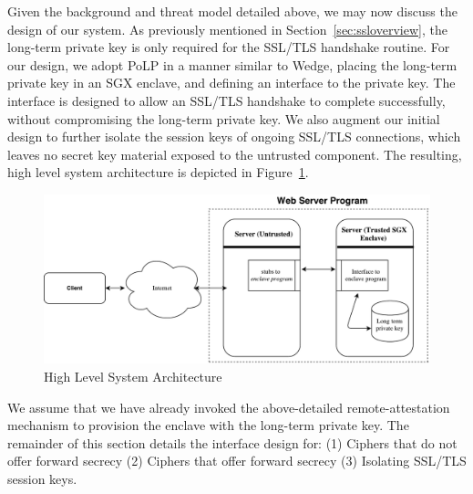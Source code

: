 \documentclass[../../main.tex]{subfiles}
\begin{document}
Given the background and threat model detailed above, we may now
discuss the design of our system. As previously mentioned in
Section~\ref{sec:ssloverview}, the long-term private key is only
required for the SSL/TLS handshake routine. For our design, we adopt
PoLP in a manner similar to Wedge, placing the long-term private key
in an SGX enclave, and defining an interface to the private key. The
interface is designed to allow an SSL/TLS handshake to complete
successfully, without compromising the long-term private key. We also
augment our initial design to further isolate the session keys of
ongoing SSL/TLS connections, which leaves no secret key material
exposed to the untrusted component. The resulting, high level system
architecture is depicted in Figure~\ref{fig:sysarch}.

\begin{figure}[H]
  \centering
  \includegraphics[scale=0.4]{images/high-level-arch.pdf}
  \caption{High Level System Architecture}
  \label{fig:sysarch}
\end{figure}

We assume that we have already invoked the above-detailed
remote-attestation mechanism to provision the enclave with the
long-term private key. The remainder of this section details the
interface design for: (1) Ciphers that do not offer forward secrecy
(2) Ciphers that offer forward secrecy (3) Isolating SSL/TLS session
keys.

\end{document}

